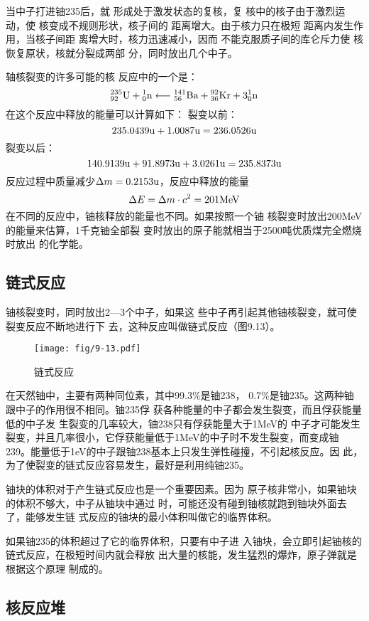 当中子打进铀235后，就
形成处于激发状态的复核，复
核中的核子由于激烈运动，使
核变成不规则形状，核子间的
距离增大。由于核力只在极短
距离内发生作用，当核子间距
离增大时，核力迅速减小，因而
不能克服质子间的库仑斥力使
核恢复原状，核就分裂成两部
分，同时放出几个中子。

轴核裂变的许多可能的核
反应中的一个是：
\[\atom{U}{235}{92}+\atom{n}{1}{0}\longleftarrow \atom{Ba}{141}{56}+\atom{Kr}{92}{36}+3\atom{n}{1}{0}\]
在这个反应中释放的能量可以计算如下：
裂变以前：
\[235.0439{\rm u}+1.0087{\rm u}=236.0526{\rm u} \]
裂变以后：
\[140.9139{\rm u}+91.8973{\rm u}+3.0261{\rm u}=235.8373{\rm u} \]
反应过程中质量减少$\Delta m=0.2153{\rm u}$，反应中释放的能量
\[\Delta E=\Delta m\cdot c^2=201{\rm MeV}\]
在不同的反应中，铀核释放的能量也不同。如果按照一个铀
核裂变时放出200MeV的能量来估算，1千克铀全部裂
变时放出的原子能就相当于2500吨优质煤完全燃烧时放出
的化学能。

\subsection{链式反应} 

铀核裂变时，同时放出2—3个中子，如果这
些中子再引起其他铀核裂变，就可使裂变反应不断地进行下
去，这种反应叫做链式反应（图9.13）。

\begin{figure}[htp]
    \centering
    \texttt{[image: fig/9-13.pdf]}
    \caption{链式反应}
\end{figure}


在天然铀中，主要有两种同位素，其中99.3\%是铀238，
0.7\%是铀235。这两种铀跟中子的作用很不相同。铀235俘
获各种能量的中子都会发生裂变，而且俘获能量低的中子发
生裂变的几率较大，铀238只有俘获能量大于1MeV的
中子才可能发生裂变，并且几率很小，它俘获能量低于1MeV的中子时不发生裂变，而变成铀239。能量低于1eV的中子跟铀238基本上只发生弹性碰撞，不引起核反应。因
此，为了使裂变的链式反应容易发生，最好是利用纯铀235。

铀块的体积对于产生链式反应也是一个重要因素。因为
原子核非常小，如果铀块的体积不够大，中子从铀块中通过
时，可能还没有碰到铀核就跑到铀块外面去了，能够发生链
式反应的铀块的最小体积叫做它的临界体积。

如果铀235的体积超过了它的临界体积，只要有中子进
入铀块，会立即引起铀核的链式反应，在极短时间内就会释放
出大量的核能，发生猛烈的爆炸，原子弹就是根据这个原理
制成的。

\subsection{核反应堆}


